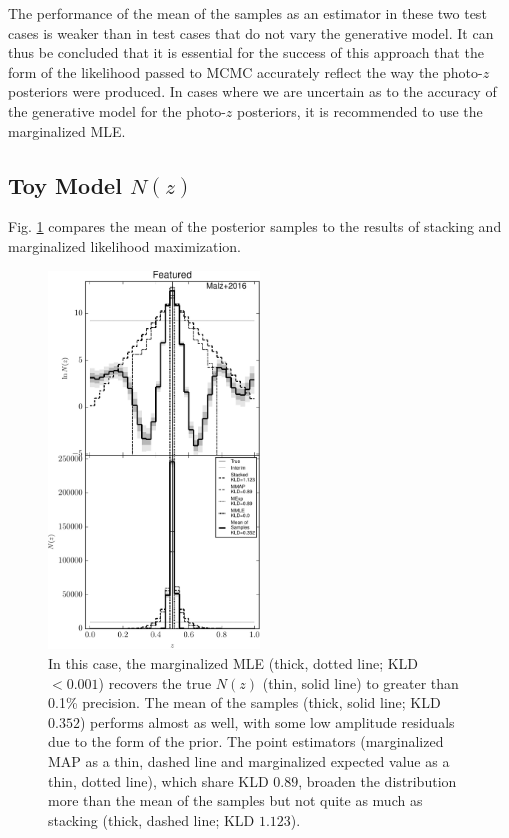 \documentclass[preprint]{aastex}
\begin{document}
The performance of the mean of the samples as an estimator in these two test 
cases is weaker than in test cases that do not vary the generative model.  It 
can thus be concluded that it is essential for the success of this approach 
that the form of the likelihood passed to MCMC accurately reflect the way the 
photo-$z$ posteriors were produced.  In cases where we are uncertain as to the 
accuracy of the generative model for the photo-$z$ posteriors, it is 
recommended to use the marginalized MLE.

\subsection{Toy Model $N(z)$}
\label{sec:fake}

Fig. \ref{fig:toy-comp} compares the mean of the posterior samples to the 
results of stacking and marginalized likelihood maximization.    


\begin{figure}
\includegraphics[width=0.5\textwidth]{figs/delt/comps.pdf}
\caption{In this case, the marginalized MLE (thick, dotted line; KLD $<0.001$) 
recovers the true $N(z)$ (thin, solid line) to greater than 0.1\% precision.  
The mean of the samples (thick, solid line; KLD $0.352$) performs almost as 
well, with some low amplitude residuals due to the form of the prior.  The 
point estimators (marginalized MAP as a thin, dashed line and marginalized 
expected value as a thin, dotted line), which share KLD $0.89$, broaden the 
distribution more than the mean of the samples but not quite as much as 
stacking (thick, dashed line; KLD $1.123$).}
\label{fig:toy-comp}
\end{figure}
\end{document}
